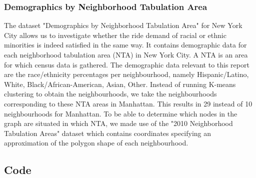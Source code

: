 \subsubsection{Demographics by Neighborhood Tabulation Area}\label{sec:demographic_data}
The dataset "Demographics by Neighborhood Tabulation Area" for New York City \citep{demographics_data} allows us to investigate whether the ride demand of racial or ethnic minorities is indeed satisfied in the same way. It contains demographic data for each neighborhood tabulation area (NTA) in New York City. A NTA is an area for which census data is gathered. The demographic data relevant to this report are the race/ethnicity percentages per neighbourhood, namely Hispanic/Latino, White, Black/African-American, Asian, Other. Instead of running K-means clustering to obtain the neighbourhoods, we take the neighbourhoods corresponding to these NTA areas in Manhattan. This results in 29 instead of 10 neighbourhoods for Manhattan. To be able to determine which nodes in the graph are situated in which NTA, we made use of the "2010 Neighborhood Tabulation Areas" dataset \citep{nta_polygon_coords} which contains coordinates specifying an approximation of the polygon shape of each neighbourhood. 

\subsection{Code}

